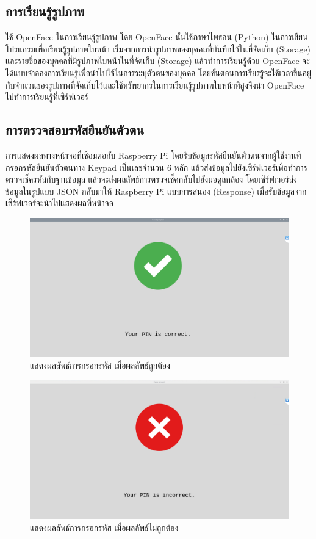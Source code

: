 \subsection{การเรียนรู้รูปภาพ}
ใช้ OpenFace ในการเรียนรู้รูปภาพ โดย OpenFace นั้นใช้ภาษาไพธอน (Python) ในการเขียนโปรแกรมเพื่อเรียนรู้รูปภาพใบหน้า เริ่มจากการนำรูปภาพของบุคคลที่บันทึกไว้ในที่จัดเก็บ (Storage) 
และรายชื่อของบุคคลที่มีรูปภาพใบหน้าในที่จัดเก็บ (Storage) แล้วทำการเรียนรู้ด้วย OpenFace จะได้แบบจำลองการเรียนรู้เพื่อนำไปใช้ในการระบุตัวตนของบุคคล 
โดยขั้นตอนการเรียรรู้จะใช้เวลาขึ้นอยู่กับจำนวนของรูปภาพที่จัดเก็บไว้และใช้ทรัพยากรในการเรียนรู้รูปภาพใบหน้าที่สูงจึงนำ OpenFace ไปทำการเรียนรู้ที่เซิร์ฟเวอร์


\subsection{การตรวจสอบรหัสยืนยันตัวตน}
การแสดงผลทางหน้าจอที่เชื่อมต่อกับ Raspberry Pi โดยรับข้อมูลรหัสยืนยันตัวตนจากผู้ใช้งานที่กรอกรหัสยืนยันตัวตนทาง Keypad เป็นเลขจำนวน 6 หลัก
แล้วส่งข้อมูลไปยังเซิร์ฟเวอร์เพื่อทำการตรวจเช็ครหัสกับฐานข้อมูล แล้วจะส่งผลลัพธ์การตรวจเช็คกลับไปยังมอดูลกล้อง
โดยเซิร์ฟเวอร์ส่งข้อมูลในรูปแบบ JSON กลับมาให้ Raspberry Pi แบบการสนอง (Response) เมื่อรับข้อมูลจากเซิร์ฟเวอร์จะนำไปแสดงผลที่หน้าจอ 

\begin{figure}[ht]
  \begin{center}
    \includegraphics[scale=.3]{pic/pin_correct.png}
  \caption[แสดงผลลัพธ์การกรอกรหัส เมื่อผลลัพธ์ถูกต้อง]{แสดงผลลัพธ์การกรอกรหัส เมื่อผลลัพธ์ถูกต้อง}
  \end{center}
  \label{fig:confirmT}
\end{figure}

\begin{figure}[ht]
  \begin{center}
    \includegraphics[scale=.3]{pic/pin_incorrect.png}
  \caption[แสดงผลลัพธ์การกรอกรหัส เมื่อผลลัพธ์ไม่ถูกต้อง]{แสดงผลลัพธ์การกรอกรหัส เมื่อผลลัพธ์ไม่ถูกต้อง}
  \end{center}
  \label{fig:confirmF}
\end{figure}